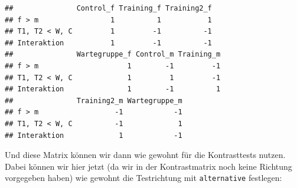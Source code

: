 \documentclass[
]{book}
\newenvironment{Shaded}{\begin{snugshade}}{\end{snugshade}}
\newcommand{\AttributeTok}[1]{\textcolor[rgb]{0.77,0.63,0.00}{#1}}
\newcommand{\FunctionTok}[1]{\textcolor[rgb]{0.00,0.00,0.00}{#1}}
\newcommand{\NormalTok}[1]{#1}
\newcommand{\SpecialCharTok}[1]{\textcolor[rgb]{0.00,0.00,0.00}{#1}}
\newcommand{\StringTok}[1]{\textcolor[rgb]{0.31,0.60,0.02}{#1}}
\begin{document}
\begin{verbatim}
##               Control_f Training_f Training2_f
## f > m                 1          1           1
## T1, T2 < W, C         1         -1          -1
## Interaktion           1         -1          -1
##               Wartegruppe_f Control_m Training_m
## f > m                     1        -1         -1
## T1, T2 < W, C             1         1         -1
## Interaktion               1        -1          1
##               Training2_m Wartegruppe_m
## f > m                  -1            -1
## T1, T2 < W, C          -1             1
## Interaktion             1            -1
\end{verbatim}

Und diese Matrix können wir dann wie gewohnt für die Kontrasttests nutzen. Dabei können wir hier jetzt (da wir in der Kontrastmatrix noch keine Richtung vorgegeben haben) wie gewohnt die Testrichtung mit \texttt{alternative} festlegen:

\begin{Shaded}
\end{Shaded}

 
  \providecommand{\huxb}[2]{\arrayrulecolor[RGB]{#1}\global\arrayrulewidth=#2pt}
  \providecommand{\huxvb}[2]{\color[RGB]{#1}\vrule width #2pt}
  \providecommand{\huxtpad}[1]{\rule{0pt}{#1}}
  \providecommand{\huxbpad}[1]{\rule[-#1]{0pt}{#1}}
\end{document}
